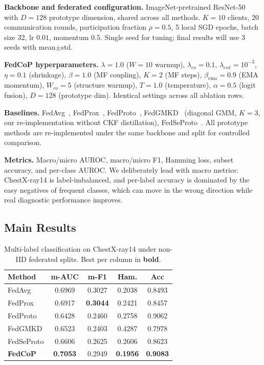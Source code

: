 \documentclass[conference]{IEEEtran}
\theoremstyle{definition}
\begin{document}
\noindent\textbf{Backbone and federated configuration.} ImageNet-pretrained ResNet-50~\cite{he2016resnet} with $D{=}128$ prototype dimension, shared across all methods. $K{=}10$ clients, 20 communication rounds, participation fraction $\rho{=}0.5$, 5 local SGD epochs, batch size 32, lr $0.01$, momentum $0.5$. Single seed for tuning; final results will use 3 seeds with mean$\pm$std.

\noindent\textbf{FedCoP hyperparameters.} $\lambda{=}1.0$ ($W{=}10$ warmup), $\lambda_{co}{=}0.1$, $\lambda_{ent}{=}10^{-3}$, $\eta{=}0.1$ (shrinkage), $\beta{=}1.0$ (MF coupling), $K{=}2$ (MF steps), $\beta_{\text{ema}}{=}0.9$ (EMA momentum), $W_{co}{=}5$ (structure warmup), $T{=}1.0$ (temperature), $\alpha{=}0.5$ (logit fusion), $D{=}128$ (prototype dim). Identical settings across all ablation rows.

\noindent\textbf{Baselines.} FedAvg~\cite{mcmahan2017fedavg}, FedProx~\cite{li2020fedprox}, FedProto~\cite{tan2022fedproto}, FedGMKD~\cite{zhang2024fedgmkd} (diagonal GMM, $K{=}3$, our re-implementation without CKF distillation), FedSeProto~\cite{fedseproto2024}. All prototype methods are re-implemented under the same backbone and split for controlled comparison.

\noindent\textbf{Metrics.} Macro/micro AUROC, macro/micro F1, Hamming loss, subset accuracy, and per-class AUROC. We deliberately lead with macro metrics: ChestX-ray14 is label-imbalanced, and per-label accuracy is dominated by the easy negatives of frequent classes, which can move in the wrong direction while real diagnostic performance improves.

\subsection{Main Results}

\begin{table}[t]
\centering
\caption{Multi-label classification on ChestX-ray14 under non-IID federated splits. Best per column in \textbf{bold}.}
\label{tab:chest}
\footnotesize
\setlength{\tabcolsep}{4pt}
\begin{tabular}{lcccc}
\toprule
Method & m-AUC & m-F1 & Ham. & Acc \\
\midrule
FedAvg    & 0.6969 & 0.3027 & 0.2038 & 0.8493 \\
FedProx   & 0.6917 & \textbf{0.3044} & 0.2421 & 0.8457 \\
FedProto  & 0.6428 & 0.2460 & 0.2758 & 0.9062 \\
FedGMKD   & 0.6523 & 0.2403 & 0.4287 & 0.7978 \\
FedSeProto& 0.6606 & 0.2625 & 0.2606 & 0.8623 \\
\midrule
\textbf{FedCoP} & \textbf{0.7053} & 0.2949 & \textbf{0.1956} & \textbf{0.9083} \\
\bottomrule
\end{tabular}
\end{table}
\end{document}
